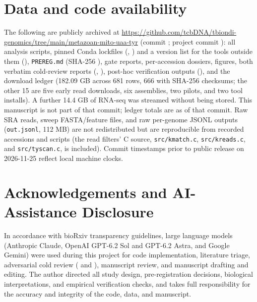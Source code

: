 \documentclass[11pt, a4paper]{article}
\begin{document}
\section{Data and code availability}
The following are publicly archived at \url{https://github.com/tcbDNA/tbiondi-genomics/tree/main/metazoan-mito-uaa-tyr} (commit \texttt{}; project commit \texttt{}): all analysis scripts, pinned Conda lockfiles (, ) and a version list for the tools outside them (), \texttt{PREREG.md} (SHA-256 \texttt{}), gate reports, per-accession dossiers, figures, both verbatim cold-review reports (, ), post-hoc verification outputs (), and the download ledger (182.09 GB across 681 rows, 666 with SHA-256 checksums; the other 15 are five early read downloads, six assemblies, two pilots, and two tool installs). A further 14.4 GB of RNA-seq was streamed without being stored. This manuscript is not part of that commit; ledger totals are as of that commit. Raw SRA reads, sweep FASTA/feature files, and raw per-genome JSONL outputs (\texttt{out.jsonl}, 112 MB) are not redistributed but are reproducible from recorded accessions and scripts (the read filters' C source, \texttt{src/kmatch.c}, \texttt{src/kreads.c}, and \texttt{src/tyscan.c}, is included). Commit timestamps prior to public release on 2026-11-25 reflect local machine clocks.

\section*{Acknowledgements and AI-Assistance Disclosure}
In accordance with bioRxiv transparency guidelines, large language models (Anthropic Claude, OpenAI GPT-6.2 Sol and GPT-6.2 Astra, and Google Gemini) were used during this project for code implementation, literature triage, adversarial cold review ( and ), manuscript review, and manuscript drafting and editing. The author directed all study design, pre-registration decisions, biological interpretations, and empirical verification checks, and takes full responsibility for the accuracy and integrity of the code, data, and manuscript.
\end{document}
